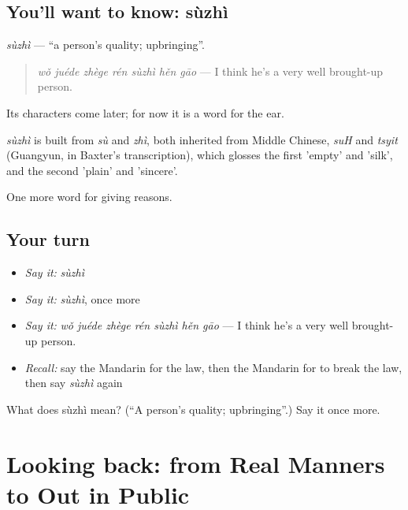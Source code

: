\subsection*{You'll want to know: sùzhì}
\emph{sùzhì} — \textquotedblleft{}a person's quality; upbringing\textquotedblright{}.

\begin{quote}
\emph{wǒ juéde zhège rén sùzhì hěn gāo} — I think he's a very well brought-up person.
\end{quote}

Its characters come later; for now it is a word for the ear.

\begin{cousinweb}
\emph{sùzhì} is built from \emph{sù} and \emph{zhì}, both inherited from Middle Chinese, \emph{suH} and \emph{tsyit} (Guangyun, in Baxter's transcription), which glosses the first 'empty' and 'silk', and the second 'plain' and 'sincere'.
\end{cousinweb}

\begin{grammarlens}[title={What you've built}]
One more word for giving reasons.
\end{grammarlens}

\subsection*{Your turn}
\begin{itemize}
\raggedright
  \item \emph{Say it:} \emph{sùzhì}
  \item \emph{Say it:} \emph{sùzhì}, once more
  \item \emph{Say it:} \emph{wǒ juéde zhège rén sùzhì hěn gāo} — I think he's a very well brought-up person.
  \item \emph{Recall:} say the Mandarin for the law, then the Mandarin for to break the law, then say \emph{sùzhì} again
\end{itemize}

\begin{tcolorbox}[breakable,colback=teal!4,colframe=teal!35!black,title={Before you move on}]
What does sùzhì mean? (\textquotedblleft{}A person's quality; upbringing\textquotedblright{}.) Say it once more.
\end{tcolorbox}
\section[(dialogue)]{Looking back: from Real Manners to Out in Public}

